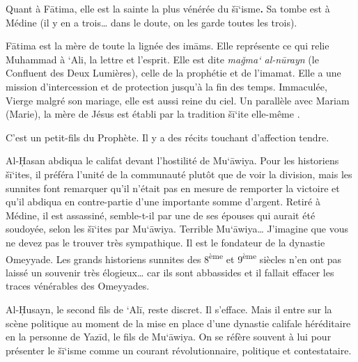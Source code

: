 Quant à Fātima, elle est la sainte la plus vénérée du šī`isme\textbf{.}
Sa tombe est à Médine (il y en a trois\ldots{} dans le doute, on les
garde toutes les trois).

Fātima est la mère de toute la lignée des imāms. Elle représente ce qui
relie Muhammad à `Ali, la lettre et l'esprit. Elle est dite \emph{maǧma`
al-nūrayn} (le Confluent des Deux Lumières), celle de la prophétie et de
l'imamat. Elle a une mission d'intercession et de protection jusqu'à la
fin des temps. Immaculée, Vierge malgré son mariage, elle est aussi
reine du ciel. Un parallèle avec Mariam (Marie), la mère de Jésus est
établi par la tradition šī`ite elle-même .


C'est un petit-fils du Prophète. Il y a des récits touchant d'affection
tendre.

Al-Ḥasan abdiqua le califat devant l'hostilité de Mu`āwiya. Pour les
historiens šī`ites, il préféra l'unité de la communauté plutôt que de
voir la division, mais les sunnites font remarquer qu'il n'était pas en
mesure de remporter la victoire et qu'il abdiqua en contre-partie d'une
importante somme d'argent. Retiré à Médine, il est assassiné,
semble-t-il par une de ses épouses qui aurait été soudoyée, selon les
šī`ites par Mu`āwiya. Terrible Mu`āwiya\ldots{} J'imagine que vous ne
devez pas le trouver très sympathique. Il est le fondateur de la
dynastie Omeyyade. Les grands historiens sunnites des
8\textsuperscript{ème} et 9\textsuperscript{ème} siècles n'en ont pas
laissé un souvenir très élogieux\ldots{} car ils sont abbassides et il
fallait effacer les traces vénérables des Omeyyades.


Al-Ḥusayn, le second fils de `Alī, reste discret. Il s'efface. Mais il
entre sur la scène politique au moment de la mise en place d'une
dynastie califale héréditaire en la personne de Yazīd, le fils de
Mu`āwiya. On se réfère souvent à lui pour présenter le šī`isme comme un
courant révolutionnaire, politique et contestataire.

